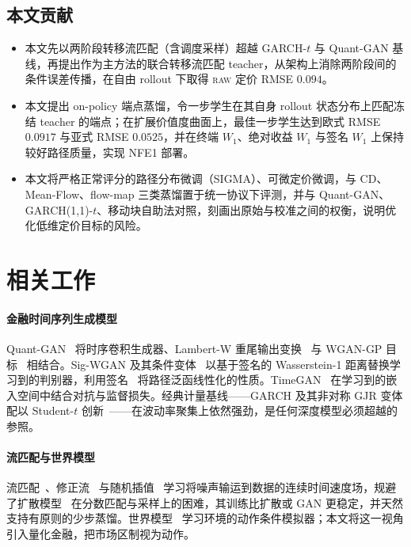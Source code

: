 \documentclass[11pt]{ctexart}
\newcommand{\raw}{\textsc{raw}}
\begin{document}
\subsection{本文贡献}
\begin{itemize}\itemsep2pt
\item 本文先以两阶段转移流匹配（含调度采样）超越 GARCH-$t$ 与 Quant-GAN 基线，再提出作为主方法的联合转移流匹配 teacher，从架构上消除两阶段间的条件误差传播，在自由 rollout 下取得 \raw{} 定价 RMSE $0.094$。
\item 本文提出 on-policy 端点蒸馏，令一步学生在其自身 rollout 状态分布上匹配冻结 teacher 的端点；在扩展价值度曲面上，最佳一步学生达到欧式 RMSE $0.0917$ 与亚式 RMSE $0.0525$，并在终端 $W_1$、绝对收益 $W_1$ 与签名 $W_1$ 上保持较好路径质量，实现 NFE1 部署。
\item 本文将严格正常评分的路径分布微调（SIGMA）、可微定价微调，与 CD、Mean-Flow、flow-map 三类蒸馏置于统一协议下评测，并与 Quant-GAN、GARCH(1,1)-$t$、移动块自助法对照，刻画出原始与校准之间的权衡，说明优化低维定价目标的风险。
\end{itemize}

\section{相关工作}
\label{sec:related}

\paragraph{金融时间序列生成模型}
Quant-GAN~\citep{wiese2020quant} 将时序卷积生成器、Lambert-W 重尾输出变换~\citep{goerg2015lambert} 与 WGAN-GP 目标~\citep{gulrajani2017improved} 相结合。Sig-WGAN 及其条件变体~\citep{ni2021sigwgan,ni2020conditional} 以基于签名的 Wasserstein-1 距离替换学习到的判别器，利用签名~\citep{lyons2007differential} 将路径泛函线性化的性质。TimeGAN~\citep{yoon2019timegan} 在学习到的嵌入空间中结合对抗与监督损失。经典计量基线——GARCH 及其非对称 GJR 变体配以 Student-$t$ 创新~\citep{bollerslev1986garch,glosten1993relation,bollerslev1987conditionally}——在波动率聚集上依然强劲，是任何深度模型必须超越的参照。

\paragraph{流匹配与世界模型}
流匹配~\citep{lipman2023flow}、修正流~\citep{liu2023rectified} 与随机插值~\citep{albergo2023stochastic} 学习将噪声输运到数据的连续时间速度场，规避了扩散模型~\citep{ho2020denoising,karras2022elucidating} 在分数匹配与采样上的困难，其训练比扩散或 GAN 更稳定，并天然支持有原则的少步蒸馏。世界模型~\citep{ha2018world,alonso2024diamond} 学习环境的动作条件模拟器；本文将这一视角引入量化金融，把市场区制视为动作。
\end{document}
